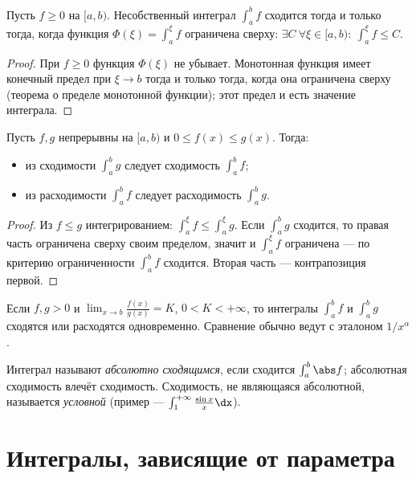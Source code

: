 \begin{theorem}
Пусть $f\ge0$ на $[a,b)$. Несобственный интеграл $\int_a^b f$ сходится тогда и только тогда, когда
функция $\Phi(\xi)=\int_a^\xi f$ ограничена сверху:
$\exists C\ \forall\xi\in[a,b):\ \int_a^\xi f\le C$.
\end{theorem}

\begin{proof}
При $f\ge0$ функция $\Phi(\xi)$ не убывает. Монотонная функция имеет конечный предел при
$\xi\to b$ тогда и только тогда, когда она ограничена сверху (теорема о пределе монотонной
функции); этот предел и есть значение интеграла.
\end{proof}

\begin{theorem}
Пусть $f,g$ непрерывны на $[a,b)$ и $0\le f(x)\le g(x)$. Тогда:
\begin{itemize}[leftmargin=*]
  \item из сходимости $\int_a^b g$ следует сходимость $\int_a^b f$;
  \item из расходимости $\int_a^b f$ следует расходимость $\int_a^b g$.
\end{itemize}
\end{theorem}

\begin{proof}
Из $f\le g$ интегрированием: $\int_a^\xi f\le\int_a^\xi g$. Если $\int_a^b g$ сходится, то правая
часть ограничена сверху своим пределом, значит и $\int_a^\xi f$ ограничена — по критерию
ограниченности $\int_a^b f$ сходится. Вторая часть — контрапозиция первой.
\end{proof}

\begin{corollary}
Если $f,g>0$ и $\displaystyle\lim_{x\to b}\frac{f(x)}{g(x)}=K$, $0<K<+\infty$, то интегралы
$\int_a^b f$ и $\int_a^b g$ сходятся или расходятся одновременно. Сравнение обычно ведут с
эталоном $1/x^\alpha$.
\end{corollary}

\begin{remark}
Интеграл называют \emph{абсолютно сходящимся}, если сходится $\int_a^b\abs f$; абсолютная
сходимость влечёт сходимость. Сходимость, не являющаяся абсолютной, называется \emph{условной}
(пример — $\int_1^{+\infty}\frac{\sin x}{x}\dx$).
\end{remark}

\section{Интегралы, зависящие от параметра}

